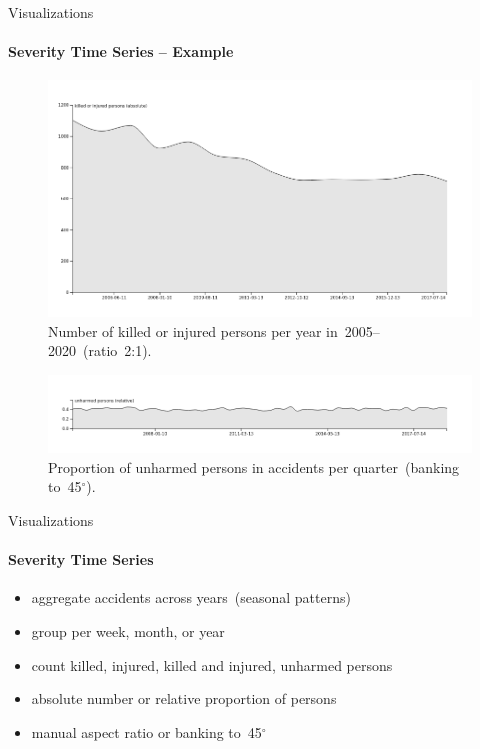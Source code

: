 \documentclass[english]{mlutalk}
\begin{document}
\begin{frame}{Visualizations}
  \framesubtitle{Severity Time Series -- Example}
  \begin{figure}
      \centering
      \includegraphics[width=0.8\linewidth]{../report/figures/time-series-2-to-1-killed-or-injured-absolute-never-per-year}
      \vspace*{-3ex}
      \caption{Number of killed or injured persons per year in~2005--2020~(ratio~2:1).}
  \end{figure}
  \vspace*{-2ex}
  \begin{figure}
      \centering
      \includegraphics[width=0.8\linewidth]{../report/figures/time-series-banking-45-unharmed-relative-never-per-quarter}
      \vspace*{-3ex}
      \caption{Proportion of unharmed persons in accidents per quarter~(banking to~45\(^\circ\)).}
  \end{figure}
\end{frame}

\begin{frame}{Visualizations}
  \framesubtitle{Severity Time Series}
  \begin{itemize}
    \setlength{\itemsep}{3ex}
    \item aggregate accidents across years~(seasonal patterns)
    \item group per week, month, or year
    \item count killed, injured, killed and injured, unharmed persons
    \item absolute number or relative proportion of persons
    \item manual aspect ratio or banking to~45\(^\circ\)
  \end{itemize}
\end{frame}
\end{document}
